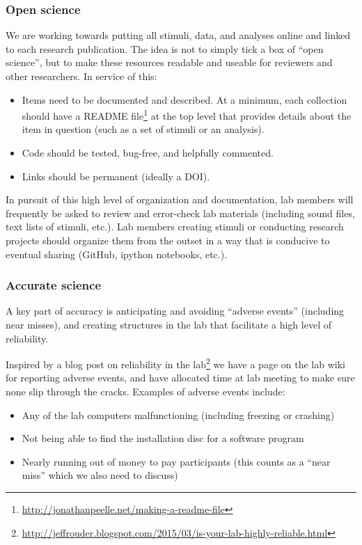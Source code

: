 \documentclass[letterpaper,12pt,oneside]{memoir}
\begin{document}
\subsubsection{Open science}

We are working towards putting all stimuli, data, and analyses online and linked to each research publication. The idea is not to simply tick a box of ``open science'', but to make these resources readable and useable for reviewers and other researchers. In service of this:

\begin{itemize}
\item Items need to be documented and described. At a minimum, each collection should have a README file\footnote{\url{http://jonathanpeelle.net/making-a-readme-file}} at the top level that provides details about the item in question (such as a set of stimuli or an analysis).

\item Code should be tested, bug-free, and helpfully commented.

\item Links should be permanent (ideally a DOI).
\end{itemize}

In pursuit of this high level of organization and documentation, lab members will frequently be asked to review and error-check lab materials (including sound files, text lists of stimuli, etc.). Lab members creating stimuli or conducting research projects should organize them from the outset in a way that is conducive to eventual sharing (GitHub, ipython notebooks, etc.).


\subsubsection{Accurate science}

A key part of accuracy is anticipating and avoiding ``adverse events'' (including near misses), and creating structures in the lab that facilitate a high level of reliability.

Inspired by a blog post on reliability in the lab\footnote{\url{http://jeffrouder.blogspot.com/2015/03/is-your-lab-highly-reliable.html}} we have a page on the lab wiki for reporting adverse events, and have allocated time at lab meeting to make sure none slip through the cracks. Examples of adverse events include:

\begin{itemize}
\item Any of the lab computers malfunctioning (including freezing or crashing)
\item Not being able to find the installation disc for a software program
\item Nearly running out of money to pay participants (this counts as a ``near miss'' which we also need to discuss)
\end{itemize}
\end{document}
